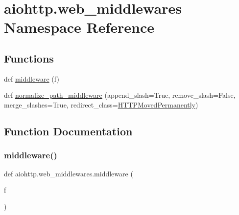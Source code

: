 \hypertarget{namespaceaiohttp_1_1web__middlewares}{}\section{aiohttp.\+web\+\_\+middlewares Namespace Reference}
\label{namespaceaiohttp_1_1web__middlewares}
\subsection*{Functions}
\begin{DoxyCompactItemize}
\item 
def \hyperlink{namespaceaiohttp_1_1web__middlewares_a0158d8af2c8f673053a943723fad70e1}{middleware} (f)
\item 
def \hyperlink{namespaceaiohttp_1_1web__middlewares_ab33bde11d99820669710909711b627f1}{normalize\+\_\+path\+\_\+middleware} (append\+\_\+slash=True, remove\+\_\+slash=False, merge\+\_\+slashes=True, redirect\+\_\+class=\hyperlink{classaiohttp_1_1web__exceptions_1_1_h_t_t_p_moved_permanently}{H\+T\+T\+P\+Moved\+Permanently})
\end{DoxyCompactItemize}


\subsection{Function Documentation}
\mbox{\label{namespaceaiohttp_1_1web__middlewares_a0158d8af2c8f673053a943723fad70e1}} 
\subsubsection{\texorpdfstring{middleware()}{middleware()}}
{\footnotesize\ttfamily def aiohttp.\+web\+\_\+middlewares.\+middleware (\begin{DoxyParamCaption}\item[{}]{f }\end{DoxyParamCaption})}

\mbox{\label{namespaceaiohttp_1_1web__middlewares_ab33bde11d99820669710909711b627f1}} 
